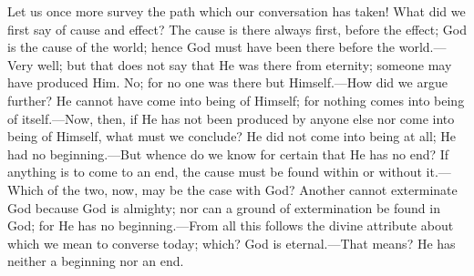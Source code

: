 Let us once more survey the path which our conversation has taken! What did we first say of cause and effect? The cause is there always first, before the effect; God is the cause of the world; hence God must have been there before the world.—Very well; but that does not say that He was there from eternity; someone may have produced Him. No; for no one was there but Himself.—How did we argue further? He cannot have come into being of Himself; for nothing comes into being of itself.—Now, then, if He has not been produced by anyone else nor come into being of Himself, what must we conclude? He did not come into being at all; He had no beginning.—But whence do we know for certain that He has no end? If anything is to come to an end, the cause must be found within or without it.—Which of the two, now, may be the case with God? Another cannot exterminate God because God is almighty; nor can a ground of extermination be found in God; for He has no beginning.—From all this
follows the divine attribute about which we mean to converse today; which? God is eternal.—That means? He has neither a beginning nor an end.

